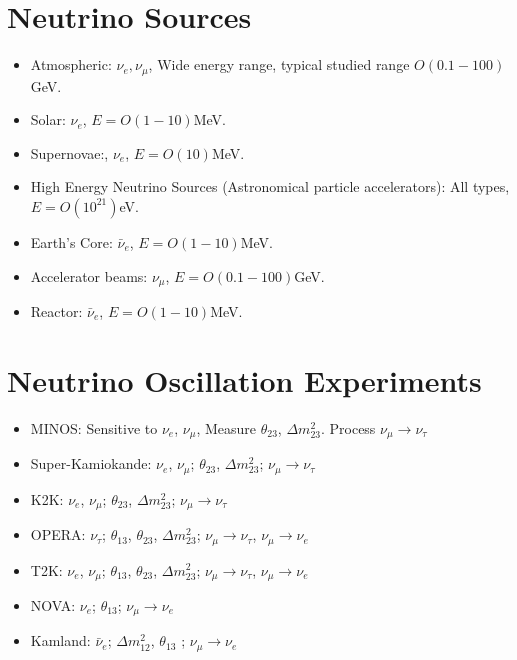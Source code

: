 \documentclass[]{article}
\begin{document}
\large

\section{Neutrino Sources}

	\begin{itemize}
		\item Atmospheric: $\nu_e, \nu_\mu$, Wide energy range, typical studied range $O(0.1-100)$GeV.
		\item Solar: $\nu_e$, $E=O(1-10)$MeV.
		\item Supernovae:, $\nu_e$, $E=O(10)$MeV.
		\item High Energy Neutrino Sources (Astronomical particle accelerators): All types, $E=O(10^{21})$eV.
		\item Earth's Core: $\bar{\nu}_e$, $E=O(1-10)$MeV.
		\item Accelerator beams:  $\nu_\mu$, $E=O(0.1-100)$GeV.
		\item Reactor: $\bar{\nu}_e$, $E=O(1-10)$MeV.
		
	\end{itemize}

\section{Neutrino Oscillation Experiments}

	\begin{itemize}
		\item MINOS: Sensitive to $\nu_e$, $\nu_\mu$, Measure $\theta_{23}$, $\Delta m^2_{23}$. Process $\nu_\mu\rightarrow\nu_\tau$
		\item Super-Kamiokande: $\nu_e$, $\nu_\mu$; $\theta_{23}$, $\Delta m^2_{23}$; $\nu_\mu\rightarrow\nu_\tau$
		\item K2K: $\nu_e$, $\nu_\mu$; $\theta_{23}$, $\Delta m^2_{23}$; $\nu_\mu\rightarrow\nu_\tau$
		\item OPERA: $\nu_\tau$;  $\theta_{13}$, $\theta_{23}$, $\Delta m^2_{23}$;  $\nu_\mu\rightarrow\nu_\tau$,  $\nu_\mu\rightarrow\nu_e$
		\item T2K:  $\nu_e$, $\nu_\mu$; $\theta_{13}$, $\theta_{23}$, $\Delta m^2_{23}$;  $\nu_\mu\rightarrow\nu_\tau$,  $\nu_\mu\rightarrow\nu_e$
		\item NOVA: $\nu_e$; $\theta_{13}$;  $\nu_\mu\rightarrow\nu_e$
		\item Kamland: $\bar{\nu}_e$; $\Delta m^2_{12}$,  $\theta_{13}$ ; $\nu_\mu\rightarrow\nu_e$
	\end{itemize}
	
\end{document}

